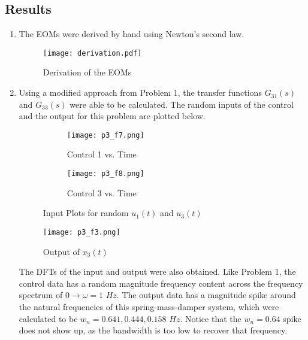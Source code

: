 \documentclass{article}
\begin{document}
\subsection{Results}
\begin{enumerate}
    \item The EOMs were derived by hand using Newton's second law.

    \begin{figure}[h]
        \centering
        \texttt{[image: derivation.pdf]}
        \caption{Derivation of the EOMs}
        \label{fig:enter-label}
    \end{figure}

    \clearpage
    
    \item Using a modified approach from Problem 1, the transfer functions $G_{31}(s)$ and $G_{33}(s)$ were able to be calculated. The random inputs of the control and the output for this problem are plotted below. 

    \begin{figure}[h]
    \centering
    \begin{subfigure}{.5\textwidth}
      \centering
      \texttt{[image: p3\_f7.png]}
      \caption{Control 1 vs. Time}
      \label{fig:sub1}
    \end{subfigure}%
    \begin{subfigure}{.5\textwidth}
      \centering
      \texttt{[image: p3\_f8.png]}
      \caption{Control 3 vs. Time}
      \label{fig:sub2}
    \end{subfigure}
    \caption{Input Plots for random $u_1(t)$ and $u_3(t)$}
    \label{fig:test}
    \end{figure}

    \begin{figure}[h]
        \centering
        \texttt{[image: p3\_f3.png]}
        \caption{Output of $x_3(t)$}
        \label{fig:enter-label}
    \end{figure}
    \newpage

    The DFTs of the input and output were also obtained. Like Problem 1, the control data has a random magnitude frequency content across the frequency spectrum of $0 \rightarrow \omega=1$ $Hz$. The output data has a magnitude spike around the natural frequencies of this spring-mass-damper system, which were calculated to be $w_n=0.641, 0.444, 0.158$ $Hz$. Notice that the $w_n=0.64$ spike does not show up, as the bandwidth is too low to recover that frequency.


\end{enumerate}
\end{document}
